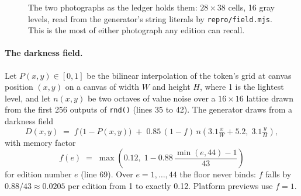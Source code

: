 \documentclass[11pt]{article}
\begin{document}
\begin{figure}[t]
  \centering
  \caption{The two photographs as the ledger holds them: $28\times38$ cells, 16 gray levels, read from the generator's string literals by \texttt{repro/field.mjs}. This is the most of either photograph any edition can recall.}
  \label{fig:grids}
\end{figure}

\paragraph{The darkness field.} Let $P(x,y)\in[0,1]$ be the bilinear interpolation of the token's grid at canvas position $(x,y)$ on a canvas of width $W$ and height $H$, where 1 is the lightest level, and let $n(x,y)$ be two octaves of value noise \citep{perlin1985} over a $16\times16$ lattice drawn from the first 256 outputs of \texttt{rnd()} (lines 35 to 42). The generator draws from a darkness field
\begin{equation}
  D(x,y) \;=\; f\,\bigl(1 - P(x,y)\bigr) \;+\; 0.85\,(1-f)\, n\!\left(3.1\tfrac{x}{W} + 5.2,\; 3.1\tfrac{y}{H}\right),
  \label{eq:field}
\end{equation}
with memory factor
\begin{equation}
  f(e) \;=\; \max\!\left(0.12,\; 1 - 0.88\,\frac{\min(e, 44) - 1}{43}\right)
  \label{eq:memory}
\end{equation}
for edition number $e$ (line 69). Over $e = 1,\ldots,44$ the floor never binds: $f$ falls by $0.88/43 \approx 0.0205$ per edition from 1 to exactly 0.12. Platform previews use $f = 1$.
\end{document}
